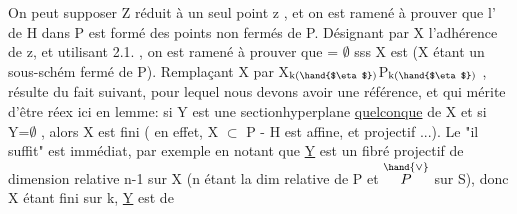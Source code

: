 On peut supposer Z réduit à un seul point z , et on est ramené à
prouver que l' de H dans P est formé  des points non fermés de P.
Désignant par X l'adhérence de z, et utilisant 2.1. , on est ramené à
prouver que \hand{$_\eta$} = $\emptyset$ sss X est   (X étant un sous-schém%
fermé  de P). Remplaçant X par X$_{\text{k(\hand{$\eta$})}}$\hand{$\hookrightarrow$}P$_{\text{k(\hand{$\eta$})}}$ ,   résulte du fait
suivant, pour lequel nous devons avoir une référence, et qui mérite d'être
réex ici en lemme: si Y est une sectionhyperplane \uline{quelconque} de
X et si Y\hand{$_\eta$}=$\emptyset$ , alors X est fini ( en effet, X $\subset$ P - H est affine, et
projectif ...). Le "il suffit" est immédiat, par exemple en notant que
\uline{Y} est un fibré projectif de dimension relative n-1 sur X (n étant la
dim relative de P  et $\overset{\hand{\vee}}{P}$ sur S), donc X étant fini sur k, \uline{Y} est de

